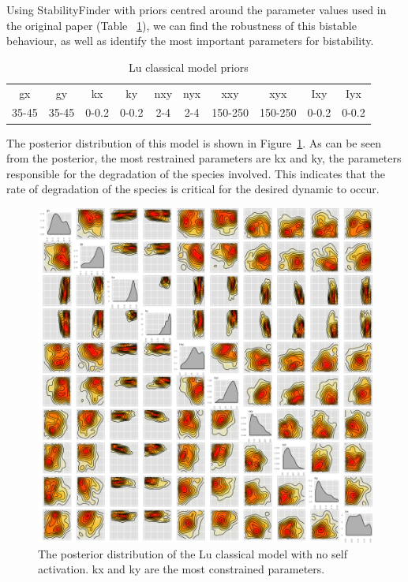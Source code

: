 \clearpage

Using StabilityFinder with priors centred around the parameter values used in the original paper (Table ~\ref{tab:lu}), we can find the robustness of this bistable behaviour, as well as identify the most important parameters for bistability. 
\begin{table}[h]
\centering
\caption{Lu classical model priors}
\label{tab:lu}
\begin{tabular}{cccccccccc}
gx    & gy    & kx    & ky    & nxy & nyx & xxy     & xyx     & Ixy   & Iyx \\
35-45 & 35-45 & 0-0.2 & 0-0.2 & 2-4 & 2-4 & 150-250 & 150-250 & 0-0.2 &   0-0.2 
\end{tabular}
\end{table}

The posterior distribution of this model is shown in Figure~\ref{fig:lu_bistable}. As can be seen from the posterior, the most restrained parameters are kx and ky, the parameters responsible for the degradation of the species involved. This indicates that the rate of degradation of the species is critical for the desired dynamic to occur. 

\begin{figure}[htbp]
\centering
\includegraphics[scale=0.25]{chapterModelling/Lu_switches/images/classic/posterior_lu_cl.png}
\caption[The posterior distribution of the Lu classical model with no self activation]{The posterior distribution of the Lu classical model with no self activation. kx and ky are the most constrained parameters.}
\label{fig:lu_bistable}
\end{figure}

